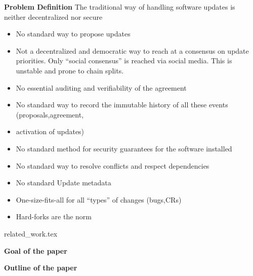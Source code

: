 \noindent\textbf{Problem Definition}
The traditional way of handling software updates is neither decentralized nor secure
\begin{itemize}
\item No standard way to propose updates
\item Not a decentralized and democratic way to reach at a consensus on update priorities. Only \enquote{social consensus} is reached via social media. This is unstable and prone to chain splits.
\item No essential auditing and verifiability of the agreement
\item No standard way to record the immutable history of all these events (proposals,agreement, \item activation of updates)
\item No standard method for security guarantees for the software installed
\item No standard way to resolve conflicts and respect dependencies 
\item No standard Update metadata
\item One-size-fits-all for all \enquote{types} of changes (bugs,CRs)
\item Hard-forks are the norm
\end{itemize}

{related_work.tex}


\noindent\textbf{Goal of the paper}

\noindent\textbf{Outline of the paper}